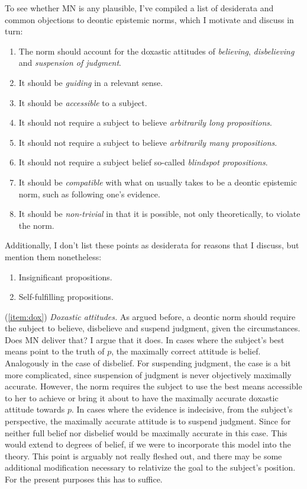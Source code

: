 \documentclass[12pt,numbers=noenddot]{scrartcl}
\begin{document}
To see whether MN is any plausible, I've compiled a list of desiderata and common objections to deontic epistemic norms, which I motivate and discuss in turn:
\begin{enumerate}
    \itemsep-0.2em
    \item \label{item:dox} The norm should account for the doxastic attitudes of \emph{believing}, \emph{disbelieving} and \emph{suspension of judgment}.
    \item \label{item:guiding} It should be \emph{guiding} in a relevant sense.
    \item \label{item:accessible}It should be \emph{accessible} to a subject.
    \item \label{item:arbitrarilylong}It should not require a subject to believe \emph{arbitrarily long propositions}.
    \item \label{item:arbitrarilymany}It should not require a subject to believe \emph{arbitrarily many propositions}.
    \item \label{item:blindspot}It should not require a subject belief so-called \emph{blindspot propositions}.
    \item \label{item:compatible}It should be \emph{compatible} with what on usually takes to be a deontic epistemic norm, such as following one's evidence.
    \item \label{item:nontrivial}It should be \emph{non-trivial} in that it is possible, not only theoretically, to violate the norm.
\end{enumerate}

Additionally, I don't list these points as desiderata for reasons that I discuss, but mention them nonetheless:
\begin{enumerate}[label=(\roman*)]
    \item \label{item:insignificant}Insignificant propositions.
    \item \label{item:self-fulfilling}Self-fulfilling propositions.
\end{enumerate}

(\ref{item:dox}) \emph{Doxastic attitudes.} 
As argued before, a deontic norm should require the subject to believe, disbelieve and suspend judgment, given the circumstances. Does MN deliver that? I argue that it does. In cases where the subject's best means point to the truth of $p$, the maximally correct attitude is belief. Analogously in the case of disbelief. For suspending judgment, the case is a bit more complicated, since suspension of judgment is never objectively maximally accurate. However, the norm requires the subject to use the best means accessible to her to achieve or bring it about to have the maximally accurate doxastic attitude towards $p$. In cases where the evidence is indecisive, from the subject's perspective, the maximally accurate attitude is to suspend judgment. Since for neither full belief nor disbelief would be maximally accurate in this case. This would extend to degrees of belief, if we were to incorporate this model into the theory. This point is arguably not really fleshed out, and there may be some additional modification necessary to relativize the goal to the subject's position. For the present purposes this has to suffice.
\end{document}
